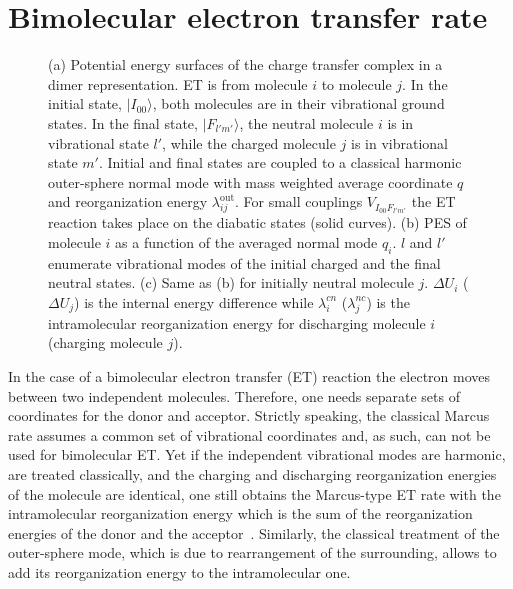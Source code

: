 \newcommand{\indM}{l} 
\newcommand{\indN}{m}
\newcommand{\lb}[1]{\langle #1 |}
\newcommand{\rb}[1]{| #1 \rangle}
\newcommand{\rbt}[1]{ #1 \rangle}

\chapter{Bimolecular electron transfer rate}
\label{sec:rate_bimolecular}

\begin{figure*}[ht]
   \caption{
(a) Potential energy surfaces of the charge transfer complex in a dimer representation. ET is from molecule $i$ to molecule $j$. In the initial state, $\rb{I_{00}}$, both molecules are in their vibrational ground states. In the final state, $\rb{F_{l'm'}}$, the neutral molecule $i$ is in vibrational state $l'$, while the charged molecule $j$ is in vibrational state $m'$. Initial and final states are coupled to a classical harmonic outer-sphere normal mode with mass weighted average coordinate $q$ and reorganization energy $\lambda_{ij}^\text{out}$. For small couplings $V_{I_{00}F_{l'm'}}$ the ET reaction takes place on the diabatic states (solid curves). 
%
(b) PES of molecule $i$ as a function of the averaged normal mode $q_i$. $l$ and $l'$ enumerate vibrational modes of the initial charged and the final neutral states. (c) Same as (b) for initially neutral molecule $j$. 
%
$\Delta U_i$ ($\Delta U_j$) is the internal energy difference while $\lambda_i^{cn}$ ($\lambda_j^{nc}$) is the  intramolecular reorganization energy for discharging molecule $i$ (charging molecule $j$). }
   \label{fig:marcus_parabolas}
\end{figure*}

In the case of a bimolecular electron transfer (ET) reaction the electron moves between two independent molecules. Therefore, one needs separate sets of coordinates for the donor and acceptor. Strictly speaking, the classical Marcus rate assumes a common set of vibrational coordinates and, as such, can not be used for bimolecular ET. Yet if the independent vibrational modes are harmonic, are treated classically, and the charging and discharging reorganization energies of the molecule are identical, one still obtains the Marcus-type ET rate with the intramolecular reorganization energy which is the sum of the reorganization energies of the donor and the acceptor~\cite{may_charge_2003}. Similarly, the classical treatment of the outer-sphere mode, which is due to rearrangement of the surrounding, allows to add its reorganization energy  to the intramolecular one.

